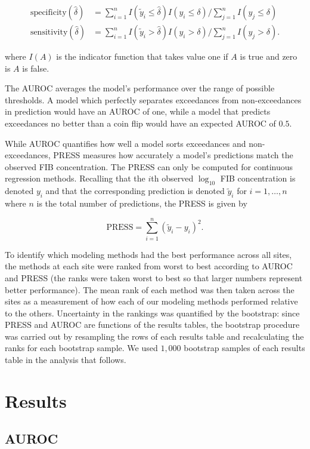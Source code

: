 \begin{align*}
\text{specificity}(\hat{\delta}) &= \sum_{i=1}^n I(\tilde{y}_i \le \hat{\delta}) I(y_i \le \delta) / \sum_{j=1}^n I(y_j \le \delta) \\
\text{sensitivity}(\hat{\delta}) &= \sum_{i=1}^n I(\tilde{y}_i > \hat{\delta}) I(y_i > \delta) / \sum_{j=1}^n I(y_j > \delta).
\end{align*}

where \(I(A)\) is the indicator function that takes value one if \(A\)
is true and zero is \(A\) is false.

The AUROC averages the model's performance over the range of possible
thresholds. A model which perfectly separates exceedances from
non-exceedances in prediction would have an AUROC of one, while a model
that predicts exceedances no better than a coin flip would have an
expected AUROC of \(0.5\).

While AUROC quantifies how well a model sorts exceedances and
non-exceedances, PRESS measures how accurately a model's predictions
match the observed FIB concentration. The PRESS can only be computed for
continuous regression methods. Recalling that the \(i\)th observed
\(\log_{10}\) FIB concentration is denoted \(y_{i}\) and that the
corresponding prediction is denoted \(\tilde{y}_i\) for \(i=1,\dots,n\)
where \(n\) is the total number of predictions, the PRESS is given by

\[\text{PRESS}=\sum_{i=1}^{n}\left(\tilde{y}_{i}-y_{i}\right)^{2}.\]

To identify which modeling methods had the best performance across all
sites, the methods at each site were ranked from worst to best according
to AUROC and PRESS (the ranks were taken worst to best so that larger
numbers represent better performance). The mean rank of each method was
then taken across the sites as a measurement of how each of our modeling
methods performed relative to the others. Uncertainty in the rankings
was quantified by the bootstrap: since PRESS and AUROC are functions of
the results tables, the bootstrap procedure was carried out by
resampling the rows of each results table and recalculating the ranks
for each bootstrap sample. We used \(1,000\) bootstrap samples of each
results table in the analysis that follows.

\section{Results}\label{results}

\subsection{AUROC}\label{auroc}

